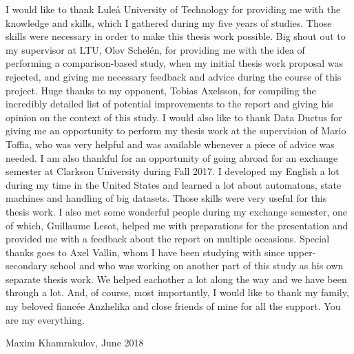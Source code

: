I would like to thank Luleå University of Technology for providing me with the knowledge and skills, which I gathered during my five years of studies. Those skills were necessary in order to make this thesis work possible. Big shout out to my supervisor at LTU, Olov Schelén, for providing me with the idea of performing a comparison-based study, when my initial thesis work proposal was rejected, and giving me necessary feedback and advice during the course of this project. Huge thanks to my opponent, Tobias Axelsson, for compiling the incredibly detailed list of potential improvements to the report and giving his opinion on the context of this study. I would also like to thank Data Ductus for giving me an opportunity to perform my thesis work at the supervision of Mario Toffia, who was very helpful and was available whenever a piece of advice was needed. I am also thankful for an opportunity of going abroad for an exchange semester at Clarkson University during Fall 2017. I developed my English a lot during my time in the United States and learned a lot about automatons, state machines and handling of big datasets. Those skills were very useful for this thesis work. I also met some wonderful people during my exchange semester, one of which, Guillaume Lesot, helped me with preparations for the presentation and provided me with a feedback about the report on multiple occasions. Special thanks goes to Axel Vallin, whom I have been studying with since upper-secondary school and who was working on another part of this study as his own separate thesis work. We helped eachother a lot along the way and we have been through a lot. And, of course, most importantly, I would like to thank my family, my beloved fiancée Anzhelika and close friends of mine for all the support. You are my everything.
\newline
\newline

\hspace{8.5cm} Maxim Khamrakulov, June 2018

